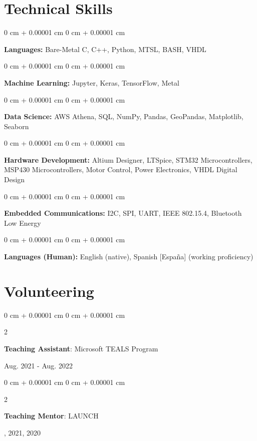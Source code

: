 \documentclass[10pt, letterpaper]{article}
\newenvironment{onecolentry}{
    \begin{adjustwidth}{
        0 cm + 0.00001 cm
    }{
        0 cm + 0.00001 cm
    }
}{
    \end{adjustwidth}
} %
\newenvironment{twocolentry}[2][]{
    \onecolentry
    \def\secondColumn{#2}
    \setcolumnwidth{\fill, 4.5 cm}
    \begin{paracol}{2}
}{
    \switchcolumn \raggedleft \secondColumn
    \end{paracol}
    \endonecolentry
} %
\begin{document}

    
    \section{Technical Skills}
        
        \begin{onecolentry}
            \textbf{Languages:} Bare-Metal C, C++, Python, MTSL, BASH, VHDL
        \end{onecolentry}

        \begin{onecolentry}
            \textbf{Machine Learning:} Jupyter, Keras, TensorFlow, Metal
        \end{onecolentry}

        \begin{onecolentry}
            \textbf{Data Science:} AWS Athena, SQL, NumPy, Pandas, GeoPandas, Matplotlib, Seaborn
        \end{onecolentry}

        \begin{onecolentry}
            \textbf{Hardware Development:} Altium Designer, LTSpice, STM32 Microcontrollers, MSP430 Microcontrollers, Motor Control, Power Electronics, VHDL Digital Design
        \end{onecolentry}

        \begin{onecolentry}
            \textbf{Embedded Communications:} I2C, SPI, UART, IEEE 802.15.4, Bluetooth Low Energy
        \end{onecolentry}

        \begin{onecolentry}
            \textbf{Languages (Human):} English (native), Spanish [Espa\~{n}a] (working proficiency)
        \end{onecolentry}

    \section{Volunteering}

        \begin{twocolentry}{
            Aug. 2021 - Aug. 2022
        }
            \textbf{Teaching Assistant}: Microsoft TEALS Program
        \end{twocolentry}

        \begin{twocolentry}{
            2022, 2021, 2020
        }
            \textbf{Teaching Mentor}: LAUNCH
        \end{twocolentry}
\end{document}
